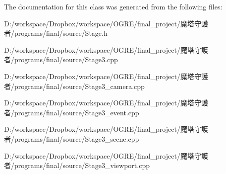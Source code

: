 The documentation for this class was generated from the following files:\begin{DoxyCompactItemize}
\item 
D:/workspace/Dropbox/workspace/OGRE/final\_\-project/魔塔守護者/programs/final/source/Stage.h\item 
D:/workspace/Dropbox/workspace/OGRE/final\_\-project/魔塔守護者/programs/final/source/Stage3.cpp\item 
D:/workspace/Dropbox/workspace/OGRE/final\_\-project/魔塔守護者/programs/final/source/Stage3\_\-camera.cpp\item 
D:/workspace/Dropbox/workspace/OGRE/final\_\-project/魔塔守護者/programs/final/source/Stage3\_\-event.cpp\item 
D:/workspace/Dropbox/workspace/OGRE/final\_\-project/魔塔守護者/programs/final/source/Stage3\_\-scene.cpp\item 
D:/workspace/Dropbox/workspace/OGRE/final\_\-project/魔塔守護者/programs/final/source/Stage3\_\-viewport.cpp\end{DoxyCompactItemize}
